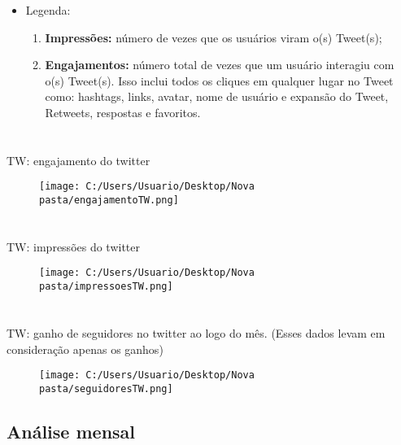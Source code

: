 \documentclass{article}%
\begin{document}
\begin{itemize}%
\item%
Legenda:%
\begin{enumerate}[label=-]%
\item%
\textbf{Impressões:} número de vezes que os usuários viram o(s) Tweet(s);%
\item%
\textbf{Engajamentos:} número total de vezes que um usuário interagiu com o(s) Tweet(s). Isso inclui todos os cliques em qualquer lugar no Tweet como: hashtags, links, avatar, nome de usuário e expansão do Tweet, Retweets, respostas e favoritos.%
\end{enumerate}%
\end{itemize}

%
\newpage%
\section*{}%
\label{sec:}%
TW: engajamento do twitter%


\begin{figure}[H]%
\centering%
\texttt{[image: C:/Users/Usuario/Desktop/Nova pasta/engajamentoTW.png]}%
\end{figure}

%
\section*{}%
\label{sec:}%
TW: impressões do twitter%


\begin{figure}[H]%
\centering%
\texttt{[image: C:/Users/Usuario/Desktop/Nova pasta/impressoesTW.png]}%
\end{figure}

%
\section*{}%
\label{sec:}%
TW: ganho de seguidores no twitter ao logo do mês. (Esses dados levam em consideração apenas os ganhos)%


\begin{figure}[H]%
\centering%
\texttt{[image: C:/Users/Usuario/Desktop/Nova pasta/seguidoresTW.png]}%
\end{figure}

%
\newpage%
\subsection*{Análise mensal}%
\label{subsec:Anlisemensal}%
\end{document}
